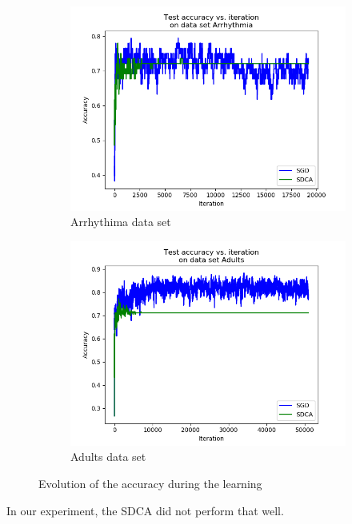 \documentclass{article}
\begin{document}
\begin{figure}[H]
	\centering
	\begin{subfigure}[t]{0.45\linewidth}
		\includegraphics[width=\linewidth]{figs/accuracy/arrhythmia.png}
		\caption{Arrhythima data set}
	\end{subfigure}
	\begin{subfigure}[t]{0.45\linewidth}
		\includegraphics[width=\linewidth]{figs/accuracy/adults.png}
		\caption{Adults data set}
	\end{subfigure}
	\caption{Evolution of the accuracy during the learning}
\end{figure}

In our experiment, the SDCA did not perform that well.
\end{document}
